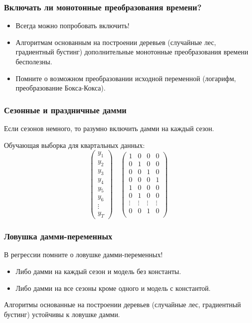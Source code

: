 \begin{frame}
  \frametitle{Включать ли монотонные преобразования времени?}

  \begin{itemize}[<+->]
    \item Всегда \alert{можно попробовать} включить!
    \item Алгоритмам основанным на построении \alert{деревьев} (случайные лес, градиентный бустинг)
    дополнительные монотонные преобразования времени \alert{бесполезны}. 
    \item Помните о возможном преобразовании \alert{исходной переменной} (логарифм, преобразование Бокса-Кокса).
  \end{itemize}
\end{frame}

\begin{frame}
  \frametitle{Сезонные и праздничные дамми}

  Если сезонов \alert{немного}, то разумно включить дамми на каждый сезон.

  \pause
  \alert{Обучающая} выборка для квартальных данных:
  \[
  \begin{pmatrix}
    y_1 \\
    y_2 \\
    y_3 \\
    y_4 \\
    y_5 \\
    y_6 \\
    \vdots \\
    y_T 
  \end{pmatrix}  \quad 
  \begin{pmatrix}
    1 & 0 & 0 & 0 \\
    0 & 1 & 0 & 0 \\
    0 & 0 & 1 & 0 \\
    0 & 0 & 0 & 1 \\
    1 & 0 & 0 & 0 \\
    0 & 1 & 0 & 0 \\
    \vdots & \vdots &  \vdots & \vdots \\
    0 & 0 & 1 & 0 \\
  \end{pmatrix}
  \]
\end{frame}


\begin{frame}
  \frametitle{Ловушка дамми-переменных}

  
  В \alert{регрессии} помните о \alert{ловушке} дамми-переменных! \pause 
  
  \begin{itemize}[<+->]
    \item Либо дамми на каждый сезон и модель без константы.
    \item Либо дамми на все сезоны кроме одного и модель с константой. 
  \end{itemize}
  
  \pause 
  Алгоритмы основанные на построении \alert{деревьев} (случайные лес, градиентный бустинг)
 \alert{устойчивы} к ловушке дамми. 
\end{frame}


